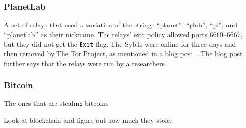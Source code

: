 \subsubsection{PlanetLab}
A set of relays that used a variation of the strings ``planet'', ``plab'',
``pl'', and ``planetlab'' as their nickname.  The relays' exit policy allowed
ports 6660--6667, but they did not get the \texttt{Exit} flag.  The Sybils were
online for three days and then removed by The Tor Project, as mentioned in a
blog post~\cite{planetlab}.  The blog post further says that the relays were run
by a researchers.

\subsubsection{Bitcoin}
The ones that are stealing bitcoins.

Look at blockchain and figure out how much they stole.
